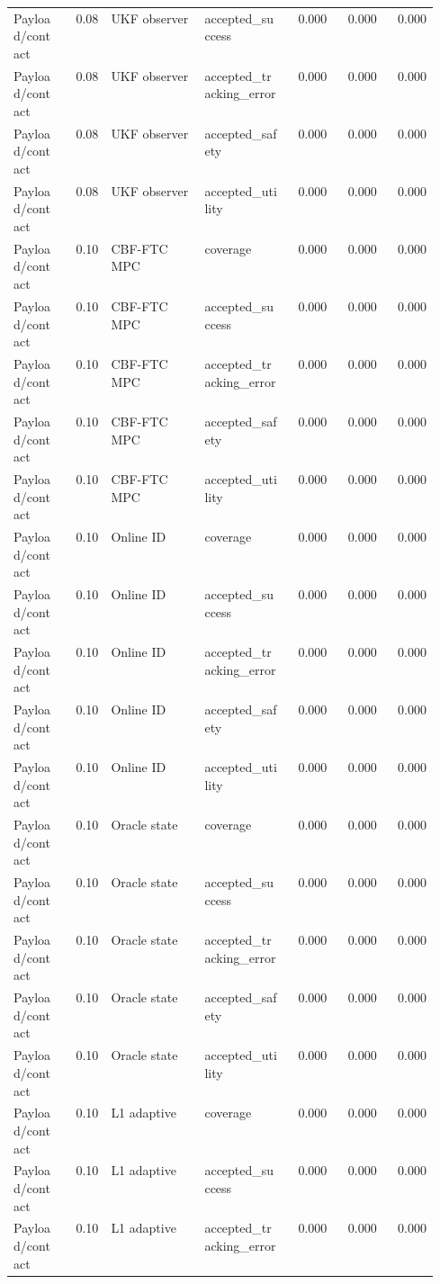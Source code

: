 \documentclass{article}
\begin{document}
\begin{center}
\begin{longtable}{p{0.13\linewidth}rp{0.22\linewidth}p{0.20\linewidth}rrr}
Payload/contact & 0.08 & UKF observer & accepted\_success & 0.000 & 0.000 & 0.000\\
Payload/contact & 0.08 & UKF observer & accepted\_tracking\_error & 0.000 & 0.000 & 0.000\\
Payload/contact & 0.08 & UKF observer & accepted\_safety & 0.000 & 0.000 & 0.000\\
Payload/contact & 0.08 & UKF observer & accepted\_utility & 0.000 & 0.000 & 0.000\\
Payload/contact & 0.10 & CBF-FTC MPC & coverage & 0.000 & 0.000 & 0.000\\
Payload/contact & 0.10 & CBF-FTC MPC & accepted\_success & 0.000 & 0.000 & 0.000\\
Payload/contact & 0.10 & CBF-FTC MPC & accepted\_tracking\_error & 0.000 & 0.000 & 0.000\\
Payload/contact & 0.10 & CBF-FTC MPC & accepted\_safety & 0.000 & 0.000 & 0.000\\
Payload/contact & 0.10 & CBF-FTC MPC & accepted\_utility & 0.000 & 0.000 & 0.000\\
Payload/contact & 0.10 & Online ID & coverage & 0.000 & 0.000 & 0.000\\
Payload/contact & 0.10 & Online ID & accepted\_success & 0.000 & 0.000 & 0.000\\
Payload/contact & 0.10 & Online ID & accepted\_tracking\_error & 0.000 & 0.000 & 0.000\\
Payload/contact & 0.10 & Online ID & accepted\_safety & 0.000 & 0.000 & 0.000\\
Payload/contact & 0.10 & Online ID & accepted\_utility & 0.000 & 0.000 & 0.000\\
Payload/contact & 0.10 & Oracle state & coverage & 0.000 & 0.000 & 0.000\\
Payload/contact & 0.10 & Oracle state & accepted\_success & 0.000 & 0.000 & 0.000\\
Payload/contact & 0.10 & Oracle state & accepted\_tracking\_error & 0.000 & 0.000 & 0.000\\
Payload/contact & 0.10 & Oracle state & accepted\_safety & 0.000 & 0.000 & 0.000\\
Payload/contact & 0.10 & Oracle state & accepted\_utility & 0.000 & 0.000 & 0.000\\
Payload/contact & 0.10 & L1 adaptive & coverage & 0.000 & 0.000 & 0.000\\
Payload/contact & 0.10 & L1 adaptive & accepted\_success & 0.000 & 0.000 & 0.000\\
Payload/contact & 0.10 & L1 adaptive & accepted\_tracking\_error & 0.000 & 0.000 & 0.000\\

\end{longtable}
\end{center}
\end{document}
